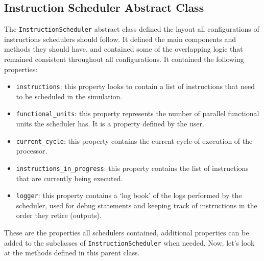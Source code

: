 \documentclass{article}
\begin{document}
\subsection{Instruction Scheduler Abstract Class}
The \lstinline|InstructionScheduler| abstract class defined the layout all configurations of instructions schedulers should follow. It defined the main components and methods they should have, and contained some of the overlapping logic that remained consistent throughout all configurations. It contained the following properties:
\begin{itemize}
    \item \lstinline|instructions|: this property looks to contain a list of instructions that need to be scheduled in the simulation.
    \item \lstinline|functional_units|: this property represents the number of parallel functional units the scheduler has. It is a property defined by the user. 
    \item \lstinline|current_cycle|: this property contains the current cycle of execution of the processor.
    \item \lstinline|instructions_in_progress|: this property contains the list of instructions that are currently being executed. 
    \item \lstinline|logger|: this property contains a `log book' of the logs performed by the scheduler, used for debug statements and keeping track of instructions in the order they retire (outputs).
\end{itemize}
These are the properties all schedulers contained, additional properties can be added to the subclasses of \lstinline|InstructionScheduler| when needed. Now, let's look at the methods defined in this parent class. 
\end{document}
